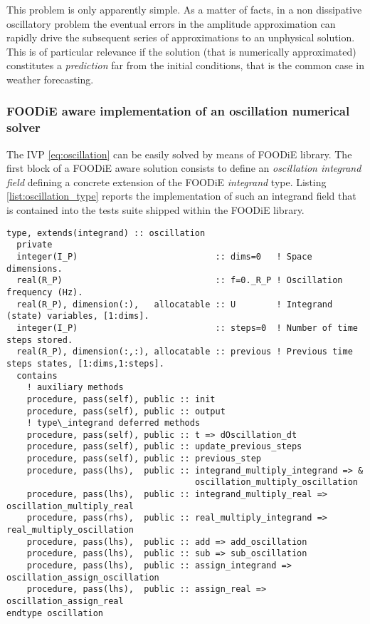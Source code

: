 \documentclass[pdftex,preprint,3p,times,numbers]{elsarticle}
\begin{document}
This problem is only apparently simple. As a matter of facts, in a non dissipative oscillatory problem the eventual errors in the amplitude approximation can rapidly drive the subsequent series of approximations to an unphysical solution. This is of particular relevance if the solution (that is numerically approximated) constitutes a \emph{prediction} far from the initial conditions, that is the common case in weather forecasting.

\subsubsection{FOODiE aware implementation of an oscillation numerical solver}
The IVP \ref{eq:oscillation} can be easily solved by means of FOODiE library. The first block of a FOODiE aware solution consists to define an \emph{oscillation integrand field} defining a concrete extension of the FOODiE \emph{integrand} type. Listing \ref{list:oscillation_type} reports the implementation of such an integrand field that is contained into the tests suite shipped within the FOODiE library.

\begin{lstlisting}[firstnumber=1,style=code,caption={implementation of the \emph{oscillation integrand} type},label={list:oscillation_type}]
type, extends(integrand) :: oscillation
  private
  integer(I_P)                           :: dims=0   ! Space dimensions.
  real(R_P)                              :: f=0._R_P ! Oscillation frequency (Hz).
  real(R_P), dimension(:),   allocatable :: U        ! Integrand (state) variables, [1:dims].
  integer(I_P)                           :: steps=0  ! Number of time steps stored.
  real(R_P), dimension(:,:), allocatable :: previous ! Previous time steps states, [1:dims,1:steps].
  contains
    ! auxiliary methods
    procedure, pass(self), public :: init
    procedure, pass(self), public :: output
    ! type\_integrand deferred methods
    procedure, pass(self), public :: t => dOscillation_dt
    procedure, pass(self), public :: update_previous_steps
    procedure, pass(self), public :: previous_step
    procedure, pass(lhs),  public :: integrand_multiply_integrand => &
                                     oscillation_multiply_oscillation
    procedure, pass(lhs),  public :: integrand_multiply_real => oscillation_multiply_real
    procedure, pass(rhs),  public :: real_multiply_integrand => real_multiply_oscillation
    procedure, pass(lhs),  public :: add => add_oscillation
    procedure, pass(lhs),  public :: sub => sub_oscillation
    procedure, pass(lhs),  public :: assign_integrand => oscillation_assign_oscillation
    procedure, pass(lhs),  public :: assign_real => oscillation_assign_real
endtype oscillation
\end{lstlisting}
\end{document}
